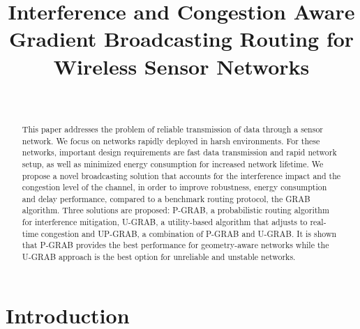 \documentclass[journal, peerreview, onecolumn, draftcls]{IEEEtran}
\begin{document}
\title{Interference and Congestion Aware Gradient Broadcasting Routing for Wireless Sensor Networks}


\author{
\\
}

\maketitle


\begin{abstract}


This paper addresses the problem of reliable transmission of data through a sensor network. We focus on networks rapidly deployed in harsh environments. For these networks, important design requirements are fast data transmission and rapid network setup, as well as minimized energy consumption for increased network lifetime.
We propose a novel broadcasting solution that accounts for the interference impact and the congestion level of the channel, in order to improve robustness, energy consumption and delay performance, compared to a benchmark routing protocol, the GRAB algorithm. Three solutions are proposed: P-GRAB, a probabilistic routing algorithm for interference mitigation, U-GRAB, a utility-based algorithm that adjusts to real-time congestion and UP-GRAB, a combination of P-GRAB and U-GRAB. It is shown that P-GRAB provides the best performance for geometry-aware networks while the U-GRAB approach is the best option for unreliable and unstable networks.
\end{abstract}





\IEEEpeerreviewmaketitle



\section{Introduction}
\end{document}
